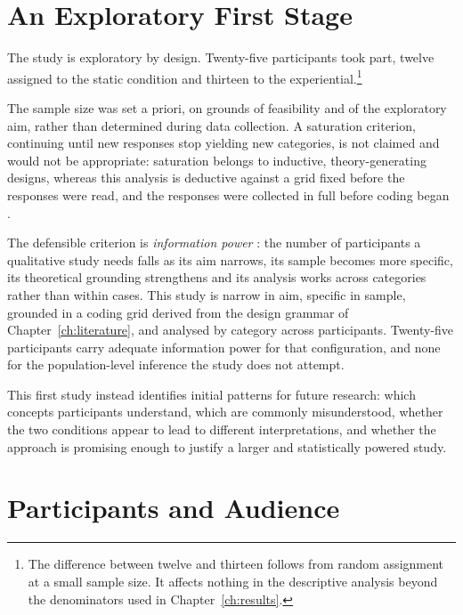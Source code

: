 \section{An Exploratory First Stage}
\label{sec:eval-exploratory}

The study is exploratory by design. Twenty-five participants took part, twelve assigned to the static condition and thirteen to the experiential.\footnote{The difference between twelve and thirteen follows from random assignment at a small sample size. It affects nothing in the descriptive analysis beyond the denominators used in Chapter~\ref{ch:results}.}

The sample size was set a priori, on grounds of feasibility and of the exploratory aim, rather than determined during data collection. A saturation criterion, continuing until new responses stop yielding new categories, is not claimed and would not be appropriate: saturation belongs to inductive, theory-generating designs, whereas this analysis is deductive against a grid fixed before the responses were read, and the responses were collected in full before coding began \citep{braunclarke2021}.

The defensible criterion is \emph{information power} \citep{malterud2016}: the number of participants a qualitative study needs falls as its aim narrows, its sample becomes more specific, its theoretical grounding strengthens and its analysis works across categories rather than within cases. This study is narrow in aim, specific in sample, grounded in a coding grid derived from the design grammar of Chapter~\ref{ch:literature}, and analysed by category across participants. Twenty-five participants carry adequate information power for that configuration, and none for the population-level inference the study does not attempt.

This first study instead identifies initial patterns for future research: which concepts participants understand, which are commonly misunderstood, whether the two conditions appear to lead to different interpretations, and whether the approach is promising enough to justify a larger and statistically powered study.

\section{Participants and Audience}
\label{sec:eval-audience}

